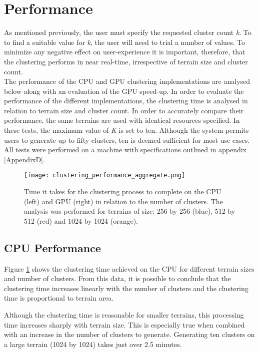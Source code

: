 \section{Performance}

As mentioned previously, the user must specify the requested cluster count \textit{k}. To to find a suitable value for \textit{k}, the user will need to trial a number of values. To minimize any negative effect on user-experience it is important, therefore, that the clustering performs in near real-time, irrespective of terrain size and cluster count.\\

The performance of the CPU and GPU clustering implementations are analysed below along with an evaluation of the GPU speed-up. In order to evaluate the performance of the different implementations, the clustering time is analysed in relation to terrain size and cluster count. In order to accurately compare their performance, the same terrains are used with identical resources specified. In these tests, the maximum value of \textit{K} is set to ten. Although the system permits users to generate up to fifty clusters, ten is deemed sufficient for most use cases. All tests were performed on a machine with specifications outlined in appendix \ref{AppendixD}.

\begin{figure}
\center
	\texttt{[image: clustering\_performance\_aggregate.png]}
	\caption{ Time it takes for the clustering process to complete on the CPU (left) and GPU (right) in relation to the number of clusters. The analysis was performed for terrains of size: 256 by 256 (blue), 512 by 512 (red) and 1024 by 1024 (orange).}	
	\label{fig:aggregate_clustering_performance}
\end{figure}

\subsection{CPU Performance}

Figure \ref{fig:aggregate_clustering_performance} shows the clustering time achieved on the CPU for different terrain sizes and number of clusters. From this data, it is possible to conclude that the clustering time increases linearly with the number of clusters and the clustering time is proportional to terrain area.

Although the clustering time is reasonable for smaller terrains, this processing time increases sharply with terrain size. This is especially true when combined with an increase in the number of clusters to generate. Generating ten clusters on a large terrain (1024 by 1024) takes just over 2.5 minutes.

